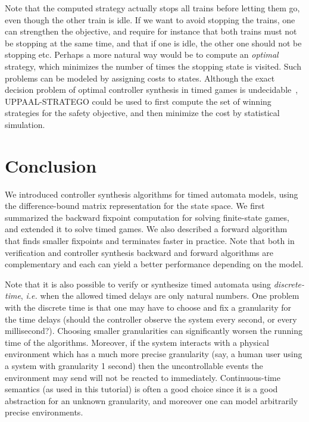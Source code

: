 \documentclass{article}
\begin{document}
\medskip

Note that the computed strategy actually stops all trains before letting them
go, even though the other train is idle. If we want to avoid stopping the
trains, one can strengthen the objective, and require for instance that both
trains must not be stopping at the same time, and that if one is idle, the other
one should not be stopping etc. Perhaps a more natural way would be to compute
an \emph{optimal} strategy, which minimizes the number of times the stopping
state is visited. Such problems can be modeled by assigning costs to states.
Although the exact decision problem of optimal controller synthesis in timed
games is undecidable~\cite{BBR-formats01}, UPPAAL-STRATEGO could be used to
first compute the set of winning strategies for the safety objective, and then
minimize the cost by statistical simulation. 


\section{Conclusion}
We introduced controller synthesis algorithms for timed automata models, using
the difference-bound matrix representation for the state space.
We first summarized the backward fixpoint computation for solving finite-state
games, and extended it to solve timed games. We also described a forward algorithm
that finds smaller fixpoints and terminates faster in practice. 
Note that both in verification and controller synthesis backward and forward
algorithms are complementary and each can yield a better performance depending
on the model. 

Note that it is also possible to verify or synthesize timed automata using
\emph{discrete-time}, \textit{i.e.} when the allowed timed delays are only
natural numbers. One problem with the discrete time is that one may have to
choose and fix a granularity for the time delays (should the controller observe
the system every second, or every millisecond?). Choosing smaller granularities
can significantly worsen the running time of the algorithms. Moreover, if the
system interacts with a physical environment which has a much more precise
granularity (say, a human user using a system with granularity 1 second) then
the uncontrollable events the environment may send will not be reacted to
immediately. 
Continuous-time semantics (as used in this tutorial) is often a good choice 
since it is a good abstraction for an unknown granularity, and moreover one can
model arbitrarily precise environments.
\end{document}
